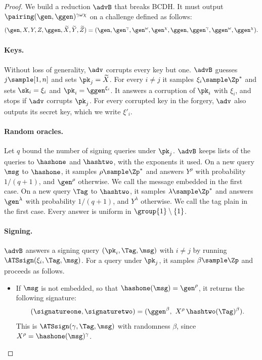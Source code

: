 \begin{proof}

  We build a reduction $\advB$ that breaks BCDH. It must output
$\pairing(\gen, \ggen)^{\gamma\omega\chi}$ on a challenge defined as follows:
%
\begin{equation*}
  (\gen, X, Y, Z, \ggen, \widetilde{X}, \widetilde{Y}, \widetilde{Z}) = (\gen,
\gen^\gamma, \gen^\omega, \gen^\chi, \ggen, \ggen^\gamma, \ggen^\omega,
\ggen^\chi).
\end{equation*}

  \paragraph{Keys.} Without loss of generality, $\adv$ corrupts every key but
one. $\advB$ guesses $j \sample [1,n]$ and sets $\pk_j = \widetilde{X}$. For every
$i \neq j$ it samples $\xi_i \sample \Zp^*$ and sets $\sk_i = \xi_i$ and $\pk_i =
\ggen^{\xi_i}$. It answers a corruption of $\pk_i$ with $\xi_i$, and stops if
$\adv$ corrupts $\pk_j$. For every corrupted key in the forgery, $\adv$ also
outputs its secret key, which we write $\xi'_i$.

  \paragraph{Random oracles.} Let $q$ bound the number of signing queries under
$\pk_j$. $\advB$ keeps lists of the queries to $\hashone$
and $\hashtwo$, with the exponents it used. On a new query $\msg$ to $\hashone$,
it samples $\rho \sample \Zp^*$ and answers $Y^\rho$ with probability $1/(q+1)$, and
$\gen^\rho$ otherwise. We call the message embedded in the first case. On a new
query $\Tag$ to $\hashtwo$, it samples $\lambda \sample \Zp^*$ and answers
$\gen^\lambda$ with probability $1/(q+1)$, and $Y^\lambda$ otherwise. We call the tag plain
in the first case. Every answer is uniform in $\group{1} \setminus \{1\}$.

  \paragraph{Signing.} $\advB$ answers a signing query $(\pk_i, \Tag, \msg)$
with $i \neq j$ by running $\ATSsign(\xi_i, \Tag, \msg)$. For a query under
$\pk_j$, it samples $\beta \sample \Zp$ and proceeds as follows.
  \begin{itemize}

    \item If $\msg$ is not embedded, so that $\hashone(\msg) = \gen^\rho$, it
returns the following signature:
%
\begin{equation*}
  (\signatureone, \signaturetwo) = (\ggen^\beta, \ X^\rho\,\hashtwo(\Tag)^\beta).
\end{equation*}
%
This is $\ATSsign(\gamma, \Tag, \msg)$ with randomness $\beta$, since $X^\rho =
\hashone(\msg)^\gamma$.


\end{itemize}
\end{proof}
